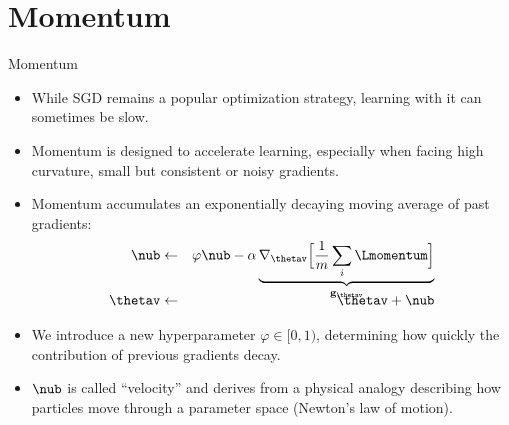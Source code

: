 \documentclass[11pt,compress,t,notes=noshow, xcolor=table]{beamer}
\begin{document}
\section{Momentum}
\begin{vbframe}{Momentum}
  \begin{itemize}
    \item While SGD remains a popular optimization strategy, learning with it can sometimes be slow. 
    \item Momentum is designed to accelerate learning, especially when facing high curvature, small but consistent or noisy gradients.
    \item Momentum accumulates an exponentially decaying moving average of past gradients:
      \begin{eqnarray*} 
        \nub &\leftarrow& \varphi \nub - \alpha \underbrace{\nabla_{\thetav} \Big[\frac{1}{m} \sum_{i} \Lmomentum \Big]}_{\mathbf{g}_{\thetav}}\\[-0.3cm]
        \thetav &\leftarrow& \thetav + \nub
      \end{eqnarray*}
    \item We introduce a new hyperparameter $\varphi \in [0, 1)$, determining how quickly the contribution of previous gradients decay.
    \item $\nub$ is called \enquote{velocity} and derives from a physical analogy describing how particles move through a parameter space (Newton's law of motion).
  \end{itemize}
\end{vbframe}
\end{document}
